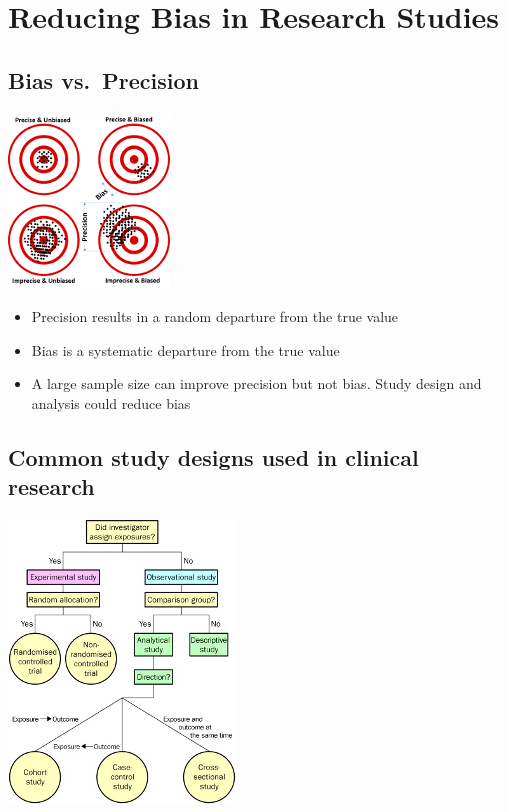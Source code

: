 \documentclass[
]{book}
\providecommand{\tightlist}{%
  \setlength{\itemsep}{0pt}\setlength{\parskip}{0pt}}
\begin{document}
\hypertarget{reducing-bias-in-research-studies}{%
\section{Reducing Bias in Research Studies}\label{reducing-bias-in-research-studies}}

\hypertarget{bias-vs.-precision}{%
\subsection{Bias vs.~Precision}\label{bias-vs.-precision}}

\includegraphics[width=0.3\linewidth]{./1_23}

\begin{itemize}
\tightlist
\item
  Precision results in a random departure from the true value
\item
  Bias is a systematic departure from the true value
\item
  A large sample size can improve precision but not bias. Study design and analysis could reduce bias
\end{itemize}

\hypertarget{common-study-designs-used-in-clinical-research}{%
\subsection{Common study designs used in clinical research}\label{common-study-designs-used-in-clinical-research}}

\includegraphics[width=0.3\linewidth]{./1_24}
\end{document}
